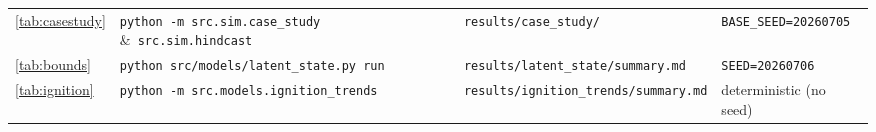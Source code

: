 \begin{table}[htbp]
\begin{tabular}{@{}p{1.6cm}p{4.6cm}p{4.0cm}p{4.0cm}@{}}
    \ref{tab:casestudy} & \texttt{python -m src.sim.case\_study} \&\
      \texttt{src.sim.hindcast} & \texttt{results/case\_study/}
      & \texttt{BASE\_SEED=20260705} \\
    \ref{tab:bounds} & \texttt{python src/models/latent\_state.py run}
      & \texttt{results/latent\_state/summary.md} & \texttt{SEED=20260706} \\
    \ref{tab:ignition} & \texttt{python -m src.models.ignition\_trends}
      & \texttt{results/ignition\_trends/summary.md} & deterministic (no seed) \\
    \bottomrule
  \end{tabular}
\end{table}
